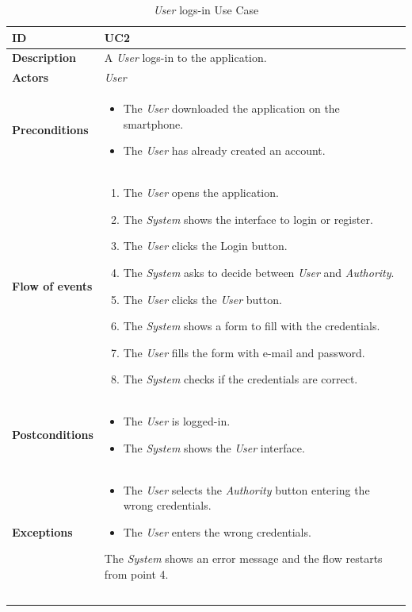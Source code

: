 \documentclass {article}
\begin{document}
	\begin{longtable}{| p{3 cm} | p{10.5 cm} |} 
			\hline
			{\bf ID} & UC2 \\
			\hline
			{\bf Description} & A {\it User} logs-in to the application.\\
			\hline
			{\bf Actors} & {\it User}\\
			\hline
			{\bf Preconditions} & 	
			\begin{itemize}
				\item The {\it User} downloaded the application on the smartphone.
				\item The {\it User} has already created an account.
			\end{itemize}
			\\
			\hline
			{\bf Flow of events} &	
			\begin{enumerate}
				\item The {\it User} opens the application.
				\item The {\it System} shows the interface to login or register.
				\item The {\it User} clicks the Login button.
				\item The {\it System} asks to decide between {\it User} and {\it Authority}.
				\item The {\it User} clicks the {\it User} button. 
				\item The {\it System} shows a form to fill with the credentials.
				\item The {\it User} fills the form with e-mail and password. 
				\item The {\it System} checks if the credentials are correct. 
			\end{enumerate}
			\\
			\hline
			{\bf Postconditions} & 
			\begin{itemize}
				\item The {\it User} is logged-in.
				\item The {\it System} shows the {\it User} interface.
			\end{itemize}
			\\
			\hline
			{\bf Exceptions} & 	
			\begin{itemize}
				\item The {\it User} selects the {\it Authority} button entering the wrong credentials. 
				\item The {\it User} enters the wrong credentials.
			\end{itemize}
			The {\it System} shows an error message and the flow restarts from point 4.
			\\ \\
			\hline
			\caption{{\it User} logs-in Use Case}
			\end{longtable}
			
\end{document}
